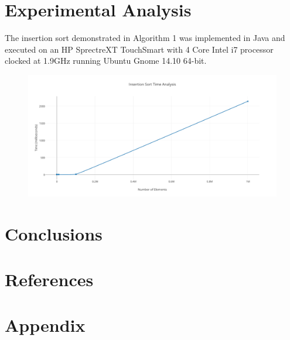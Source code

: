 \documentclass[onecolumn, 12pt, article]{IEEEtran}
\numberwithin{case}{problem}
\numberwithin{condition}{problem}
\numberwithin{condition}{subsection}
\numberwithin{definition}{section}
\theoremstyle{remark}
\numberwithin{question}{problem}
\theoremstyle{plain}
\numberwithin{answer}{problem}
\numberwithin{solution}{section}
\numberwithin{equation}{section}%
\begin{document}
\section{Experimental Analysis}
 The insertion sort demonstrated in Algorithm 1 was implemented in Java and executed on an HP SprectreXT TouchSmart with 4 Core Intel i7 processor clocked at 1.9GHz running Ubuntu Gnome 14.10 64-bit.
 \begin{figure}[!]
\begin{center}
\includegraphics[width=0.7\linewidth]{insertion_sort_time_analysis.pdf}
\end{center}
\label{fig:insertionsorttimeanalysis}
\end{figure}


\section{Conclusions}


\newpage

\section*{References}


\newpage

\section*{Appendix}






\end{document}
